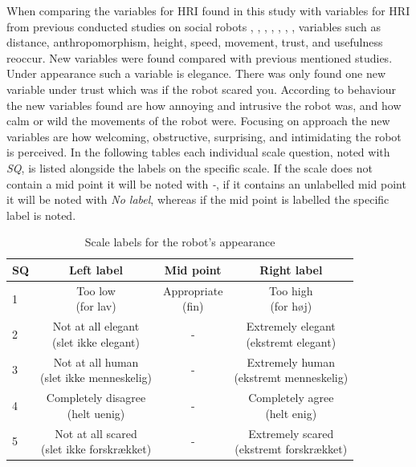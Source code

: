 %
When comparing the variables for HRI found in this study with variables for HRI from previous conducted studies on social robots \cite{PDF:ExploringInfluencingVariable}, \cite{PDF:SharingALifeHarvey}, \cite{PDF:InTheCompanyofRobots}, \cite{PDF:CloseButNotStuck}, \cite{PDF:TheImpactOfTraveler}, \cite{PDF:HumanRobotEmodiedInteraction}, \cite{PDF:RecommendationEffects}, variables such as distance, anthropomorphism, height, speed, movement, trust, and usefulness reoccur. New variables were found compared with previous mentioned studies. Under appearance such a variable is elegance. There was only found one new variable under trust which was if the robot scared you. According to behaviour the new variables found are how annoying and intrusive the robot was, and how calm or wild the movements of the robot were. Focusing on approach the new variables are how welcoming, obstructive, surprising, and intimidating the robot is perceived. In the following tables each individual scale question, noted with \textit{SQ}, is listed alongside the labels on the specific scale. If the scale does not contain a mid point it will be noted with \textit{-}, if it contains an unlabelled mid point it will be noted with \textit{No label}, whereas if the mid point is labelled the specific label is noted. 
%
\begin{table}[H]
	\centering
\caption{Scale labels for the robot's appearance}
	\label{tab:AppearanceScale} 
	\begin{tabular}{l|c|c|c}
		SQ     & Left label & Mid point & Right label \\\hline
		1   & \makecell{Too low \\(for lav)}  & \makecell{Appropriate \\(fin)} & \makecell{Too high \\(for høj)}        \\\hline
		2   & \makecell{Not at all elegant \\(slet ikke elegant)} & - & \makecell{Extremely elegant \\(ekstremt elegant)}         \\\hline
		3   & \makecell{Not at all human \\(slet ikke menneskelig)} & - & \makecell{Extremely human \\(ekstremt menneskelig)}         \\\hline
	 	4   & \makecell{Completely disagree \\(helt uenig)} & - & \makecell{Completely agree \\(helt enig)}         \\\hline
		5   & \makecell{Not at all scared \\(slet ikke forskrækket)} & -  & \makecell{Extremely scared \\(ekstremt forskrækket)}           
	\end{tabular}        
\end{table}
